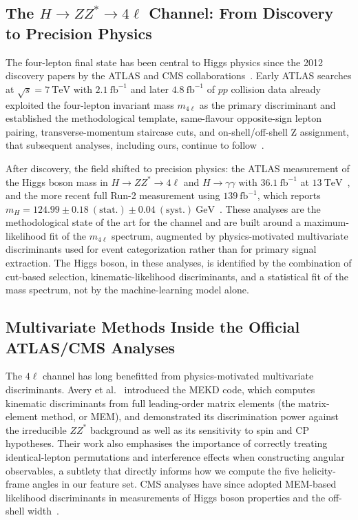 \documentclass[conference]{IEEEtran}
\begin{document}
{\subsection{The {$H \rightarrow ZZ^{*} \rightarrow 4\ell$} Channel: From Discovery to Precision Physics}
 
The four-lepton final state has been central to Higgs physics since the 2012 discovery papers by the ATLAS and CMS collaborations~\cite{atlas2012observation,cms2012observation}. Early ATLAS searches at $\sqrt{s}=7~\mathrm{TeV}$ with $2.1~\mathrm{fb}^{-1}$ and later $4.8~\mathrm{fb}^{-1}$ of $pp$ collision data already exploited the four-lepton invariant mass $m_{4\ell}$ as the primary discriminant and established the methodological template, same-flavour opposite-sign lepton pairing, transverse-momentum staircase cuts, and on-shell/off-shell Z assignment, that subsequent analyses, including ours, continue to follow~\cite{atlas2012zz48fb,atlas2011zz21fb}.
 
After discovery, the field shifted to precision physics: the ATLAS measurement of the Higgs boson mass in $H \rightarrow ZZ^{*} \rightarrow 4\ell$ and $H \rightarrow \gamma\gamma$ with $36.1~\mathrm{fb}^{-1}$ at $13~\mathrm{TeV}$~\cite{atlas2018higgsmass}, and the more recent full Run-2 measurement using $139~\mathrm{fb}^{-1}$, which reports $m_H = 124.99 \pm 0.18~(\mathrm{stat.}) \pm 0.04~(\mathrm{syst.})~\mathrm{GeV}$~\cite{atlas2023run2mass}. These analyses are the methodological state of the art for the channel and are built around a maximum-likelihood fit of the $m_{4\ell}$ spectrum, augmented by physics-motivated multivariate discriminants used for event categorization rather than for primary signal extraction. The Higgs boson, in these analyses, is identified by the combination of cut-based selection, kinematic-likelihood discriminants, and a statistical fit of the mass spectrum, not by the machine-learning model alone.
 
\subsection{Multivariate Methods Inside the Official ATLAS/CMS Analyses}
 
The $4\ell$ channel has long benefitted from physics-motivated multivariate discriminants. Avery et al.~\cite{avery2013mekd} introduced the MEKD code, which computes kinematic discriminants from full leading-order matrix elements (the matrix-element method, or MEM), and demonstrated its discrimination power against the irreducible $ZZ^{*}$ background as well as its sensitivity to spin and CP hypotheses. Their work also emphasises the importance of correctly treating identical-lepton permutations and interference effects when constructing angular observables, a subtlety that directly informs how we compute the five helicity-frame angles in our feature set. CMS analyses have since adopted MEM-based likelihood discriminants in measurements of Higgs boson properties and the off-shell width~\cite{cms2021higgs4l}.
 
}
\end{document}
